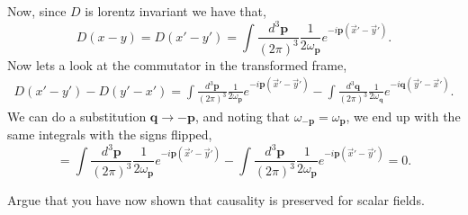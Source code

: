 \documentclass[working, oneside]{../../Preambles/tuftebook}
\begin{document}
Now, since $D$ is lorentz invariant we have that,
\[
D\left( x-y \right) = D\left( x'-y' \right) = \int \frac{d^3\mathbf{p}}{\left( 2\pi \right) ^3} \frac{1}{2\omega_{\mathbf{p}}}e^{-i\mathbf{p}\left( \vec{x}' - \vec{y}' \right) }
.\] 
Now lets a look at the commutator in the transformed frame,
\begin{align*}
 D\left( x'-y' \right) - D\left( y' - x'\right) = \int \frac{d^3\mathbf{p}}{\left( 2\pi \right) ^3} \frac{1}{2\omega_{\mathbf{p}}}e^{-i\mathbf{p}\left( \vec{x}' - \vec{y}' \right) } - \int \frac{d^3\mathbf{q}}{\left( 2\pi \right) ^3} \frac{1}{2\omega_{\mathbf{q}}}e^{-i\mathbf{q}\left( \vec{y}' - \vec{x}' \right) }
.\end{align*}
We can do a substitution $\mathbf{q} \to \mathbf{-p}$, and noting that $\omega_{-\mathbf{p}} = \omega_{\mathbf{p}}$, we end up with the same integrals with the signs flipped,
\[
 = \int \frac{d^3\mathbf{p}}{\left( 2\pi \right) ^3} \frac{1}{2\omega_{\mathbf{p}}}e^{-i\mathbf{p}\left( \vec{x}' - \vec{y}' \right) } - \int \frac{d^3\mathbf{p}}{\left( 2\pi \right) ^3} \frac{1}{2\omega_{\mathbf{p}}}e^{-i\mathbf{p}\left( \vec{x}' - \vec{y}' \right) }=0
.\] 
\begin{exercise}[4]
Argue that you have now shown that causality is preserved for scalar fields.
\end{exercise}
\end{document}
